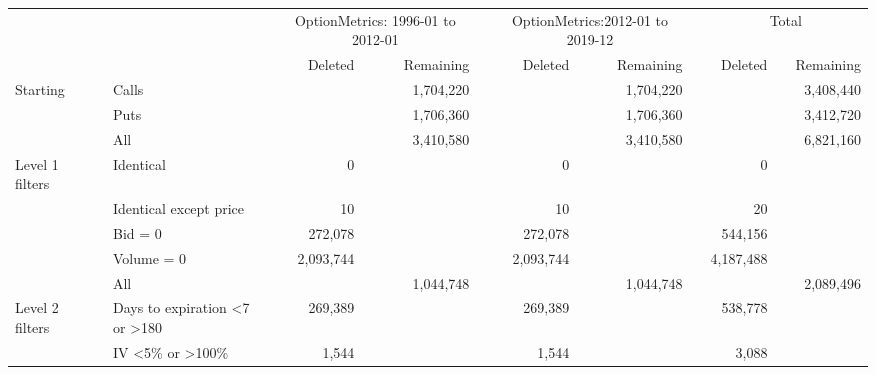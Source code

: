 

    \begin{tabular}{*{4}{l} *{11}{r} }
       
        
         \multicolumn{4}{c}{}  & \multicolumn{3}{c}{OptionMetrics: 1996-01 to 2012-01}  &  \multicolumn{1}{c}{} & 
         \multicolumn{3}{c}{OptionMetrics:2012-01 to 2019-12}&  \multicolumn{1}{c}{}  &
          \multicolumn{3}{c}{Total}  \\
         \cline{5-7}
                  
         \cline{9-11}
         \cline{13-15}
         
          &  & & & 
          Deleted &  & Remaining & &
          Deleted &  & Remaining & &
          Deleted &  & Remaining 
          \\

       \hline

	
				Starting & & Calls & &
				 & & 1,704,220 & &
				 & & 1,704,220 & &
				 & & 3,408,440 \\
			
				  & & Puts & &
				 & & 1,706,360 & &
				 & & 1,706,360 & &
				 & & 3,412,720 \\
			
				  & & All & &
				 & & 3,410,580 & &
				 & & 3,410,580 & &
				 & & 6,821,160 \\
			
				Level 1 filters & & Identical & &
				0 & &  & &
				0 & &  & &
				0 & &  \\
			
				  & & Identical except price & &
				10 & &  & &
				10 & &  & &
				20 & &  \\
			
				  & & Bid = 0 & &
				272,078 & &  & &
				272,078 & &  & &
				544,156 & &  \\
			
				  & & Volume = 0 & &
				2,093,744 & &  & &
				2,093,744 & &  & &
				4,187,488 & &  \\
			
				  & & All & &
				 & & 1,044,748 & &
				 & & 1,044,748 & &
				 & & 2,089,496 \\
			
				Level 2 filters & & Days to expiration <7 or >180 & &
				269,389 & &  & &
				269,389 & &  & &
				538,778 & &  \\
			
				  & & IV <5\% or >100\% & &
				1,544 & &  & &
				1,544 & &  & &
				3,088 & &  \\
			

\end{tabular}
